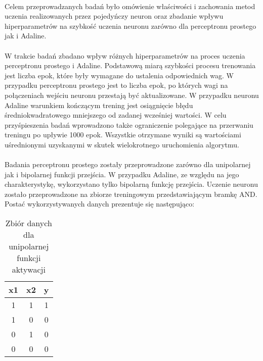 \documentclass[../main.tex]{subfiles}
\begin{document}
    \paragraph{}
    \justify
    Celem przeprowadzanych badań było omówienie właściwości i zachowania metod uczenia realizowanych przez pojedyńczy neuron oraz zbadanie wpływu hiperparametrów na szybkość uczenia neuronu zarówno dla perceptronu prostego jak i Adaline.
    
    \paragraph{}
    \justify
    W trakcie badań zbadano wpływ różnych hiperparametrów na proces uczenia perceptronu prostego i Adaline. Podstawową miarą szybkości procesu trenowania jest liczba epok, które były wymagane do ustalenia odpowiednich wag.
    W przypadku perceptronu prostego jest to liczba epok, po których wagi na połączeniach wejściu neuronu przestają być aktualizowane. W przypadku neuronu Adaline warunkiem kończącym trening jest osiągnięcie błędu średniokwadratowego mniejszego od zadanej wcześniej wartości. W celu przyśpieszenia badań wprowadzono także ograniczenie polegające na przerwaniu treningu po upływie 1000 epok. Wszystkie otrzymane wyniki są wartościami uśrednionymi uzyskanymi w skutek wielokrotnego uruchomienia algorytmu.

    \paragraph{}
    \justify
    Badania perceptronu prostego zostały przeprowadzone zarówno dla unipolarnej jak i bipolarnej funkcji przejścia. W przypadku Adaline, ze względu na jego charakterystykę, wykorzystano tylko bipolarną funkcję przejścia. Uczenie neuronu zostało przeprowadzone na zbiorze treningowym przedstawiającym bramkę AND.  Postać wykorzystywanych danych prezentuje się następująco:
    
    \begin{table}[h]
    \centering
    \begin{tabular}{|| c | c | c ||}
    \hline
    x1 & x2 & y \\ \hline
    1  & 1  & 1 \\
    1  & 0  & 0 \\
    0  & 1  & 0 \\
    0  & 0  & 0 \\ \hline
    \end{tabular}
    \caption{Zbiór danych dla unipolarnej funkcji aktywacji}
    \label{dataset_unipolar:1}
    \end{table}
    
\end{document}
